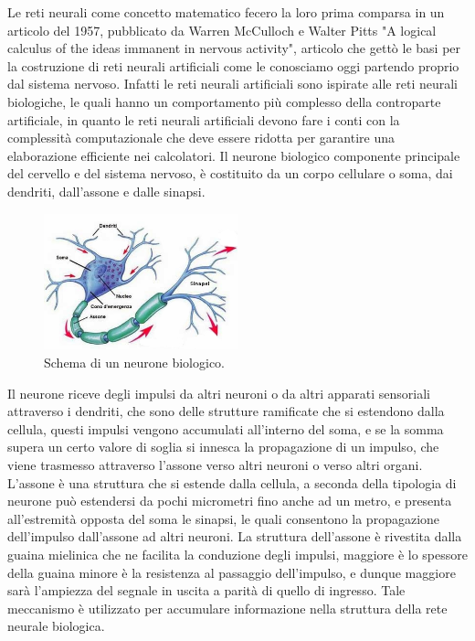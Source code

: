 Le reti neurali come concetto matematico fecero la loro prima comparsa in un articolo del 1957, pubblicato da Warren McCulloch e Walter Pitts
"A logical calculus of the ideas immanent in nervous activity", articolo che gettò le basi per la costruzione di reti neurali artificiali
come le conosciamo oggi partendo proprio dal sistema nervoso.
Infatti le reti neurali artificiali sono ispirate alle reti neurali biologiche, le quali hanno un comportamento più complesso della
controparte artificiale, in quanto le reti neurali artificiali devono fare i conti con la complessità computazionale che deve essere 
ridotta per garantire una elaborazione efficiente nei calcolatori.
Il neurone biologico componente principale del cervello e del sistema nervoso, è costituito da un corpo cellulare o soma, dai dendriti, 
dall'assone e dalle sinapsi.
    \begin{figure}[H]
        \centering
        \includegraphics[width=0.5\textwidth]{imgs/neurone.jpg}
        \caption{Schema di un neurone biologico.}
        \label{fig:neuron_bio}
    \end{figure}
Il neurone riceve degli impulsi da altri neuroni o da altri apparati sensoriali attraverso i dendriti, che sono delle strutture ramificate
che si estendono dalla cellula, questi impulsi vengono accumulati all'interno del soma, e se la somma supera un certo valore di soglia
si innesca la propagazione di un impulso, che viene trasmesso attraverso l'assone verso altri neuroni o verso altri organi.
L'assone è una struttura che si estende dalla cellula, a seconda della tipologia di neurone può estendersi da pochi micrometri fino anche ad un metro,
e presenta all'estremità opposta del soma le sinapsi, le quali consentono la propagazione dell'impulso dall'assone ad altri neuroni.
La struttura dell'assone è rivestita dalla guaina mielinica che ne facilita la conduzione degli impulsi, maggiore è lo spessore della guaina
minore è la resistenza al passaggio dell'impulso, e dunque maggiore sarà l'ampiezza del segnale in uscita a parità di quello di ingresso. 
Tale meccanismo è utilizzato per accumulare informazione nella struttura della rete neurale biologica.

